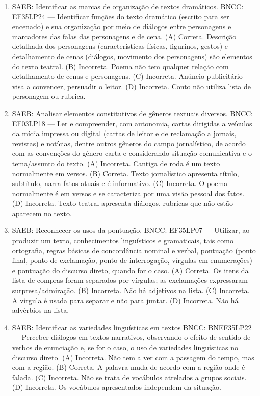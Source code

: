 \begin{enumerate}
\item
SAEB: Identificar as marcas de organização de textos dramáticos. 
BNCC: EF35LP24 --- Identificar funções do texto dramático (escrito para ser encenado) e sua organização por meio de diálogos entre personagens e marcadores das falas das personagens e de cena. 
(A) Correta. Descrição detalhada dos personagens (características físicas, figurinos, gestos) e detalhamento de cenas (diálogos, movimento dos personagens) são elementos do texto teatral. 
(B) Incorreta. Poema não tem qualquer relação com detalhamento de cenas e personagens.
(C) Incorreta. Anúncio publicitário visa a convencer, persuadir o leitor.
(D) Incorreta. Conto não utiliza lista de personagem ou rubrica.

\item
SAEB: Analisar elementos constitutivos de gêneros textuais diversos. 
BNCC: EF03LP18 --- Ler e compreender, com autonomia, cartas dirigidas a veículos da mídia impressa ou digital (cartas de leitor e de reclamação a jornais, revistas) e notícias, dentre outros gêneros do campo jornalístico, de acordo com as convenções do gênero carta e considerando situação comunicativa e o tema/assunto do texto. 
(A) Incorreta. Cantiga de roda é um texto normalmente em versos. 
(B) Correta. Texto jornalístico apresenta título, subtítulo, narra fatos atuais e é informativo. 
(C) Incorreta. O poema normalmente é em versos e se caracteriza por uma visão pessoal dos fatos. 
(D) Incorreta. Texto teatral apresenta diálogos, rubricas que não estão aparecem no texto.

\item
SAEB: Reconhecer os usos da pontuação. 
BNCC: EF35LP07 --- Utilizar, ao produzir um texto, conhecimentos linguísticos e gramaticais, tais como ortografia, regras básicas de concordância nominal e verbal, pontuação (ponto final, ponto de exclamação, ponto de interrogação, vírgulas em enumerações) e pontuação do discurso direto, quando for o caso. 
(A) Correta. Os itens da lista de compras foram separados por vírgulas; as exclamações expressaram surpresa/admiração. 
(B) Incorreta. Não há adjetivos na lista. 
(C) Incorreta. A vírgula é usada para separar e não para juntar. 
(D) Incorreta. Não há advérbios na lista.

\item
SAEB: Identificar as variedades linguísticas em textos 
BNCC: BNEF35LP22 --- Perceber diálogos em textos narrativos, observando o efeito de sentido de verbos de enunciação e, se for o caso, o uso de variedades linguísticas no discurso direto. 
(A) Incorreta. Não tem a ver com a passagem do tempo, mas com a região. 
(B) Correta. A palavra muda de acordo com a região onde é falada. 
(C) Incorreta. Não se trata de vocábulos atrelados a grupos sociais. 
(D) Incorreta. Os vocábulos apresentados independem da situação.


\end{enumerate}
